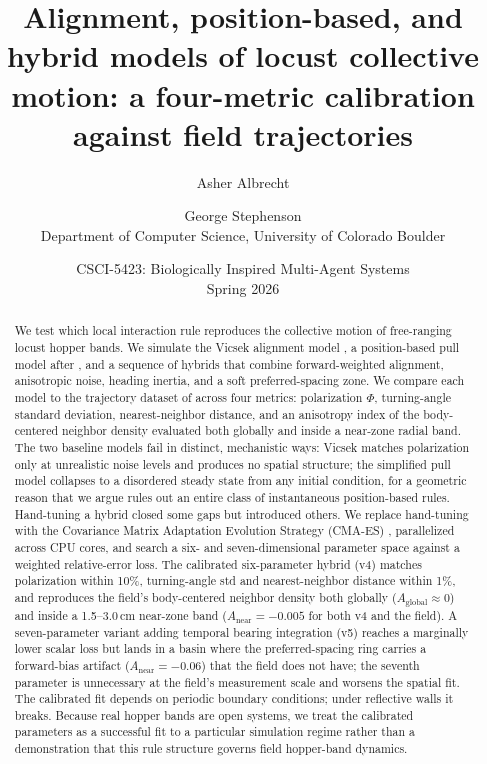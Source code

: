 \documentclass[11pt]{article}
\title{Alignment, position-based, and hybrid models of locust collective
motion: a four-metric calibration against field trajectories}
\author{Asher Albrecht \and George Stephenson \\
Department of Computer Science, University of Colorado Boulder}
\date{CSCI-5423: Biologically Inspired Multi-Agent Systems \\ Spring 2026}
\begin{document}
\maketitle

\begin{abstract}
We test which local interaction rule reproduces the collective motion of
free-ranging locust hopper bands. We simulate the Vicsek alignment model
\citep{vicsek1995}, a position-based pull model after \citet{sayin2025},
and a sequence of hybrids that combine forward-weighted alignment,
anisotropic noise, heading inertia, and a soft preferred-spacing zone. We
compare each model to the trajectory dataset of \citet{weinburd2024}
across four metrics: polarization $\Phi$, turning-angle standard deviation,
nearest-neighbor distance, and an anisotropy index of the body-centered
neighbor density evaluated both globally and inside a near-zone radial
band. The two baseline models fail in distinct, mechanistic ways: Vicsek
matches polarization only at unrealistic noise levels and produces no
spatial structure; the simplified pull model collapses to a disordered
steady state from any initial condition, for a geometric reason that we
argue rules out an entire class of instantaneous position-based rules.
Hand-tuning a hybrid closed some gaps but introduced others. We replace
hand-tuning with the Covariance Matrix Adaptation Evolution Strategy
(CMA-ES) \citep{hansen2016}, parallelized across CPU cores, and search a
six- and seven-dimensional parameter space against a weighted
relative-error loss. The calibrated six-parameter hybrid (v4) matches
polarization within 10\%, turning-angle std and nearest-neighbor distance
within 1\%, and reproduces the field's body-centered neighbor density
both globally ($A_\text{global} \approx 0$) and inside a 1.5--3.0\,cm
near-zone band ($A_\text{near} = -0.005$ for both v4 and the field). A
seven-parameter variant adding temporal bearing integration (v5) reaches
a marginally lower scalar loss but lands in a basin where the
preferred-spacing ring carries a forward-bias artifact ($A_\text{near}
= -0.06$) that the field does not have; the seventh parameter is
unnecessary at the field's measurement scale and worsens the spatial
fit. The calibrated fit depends on periodic boundary conditions; under
reflective walls it breaks. Because real hopper bands are open systems,
we treat the calibrated parameters as a successful fit to a particular
simulation regime rather than a demonstration that this rule structure
governs field hopper-band dynamics.
\end{abstract}
\end{document}
